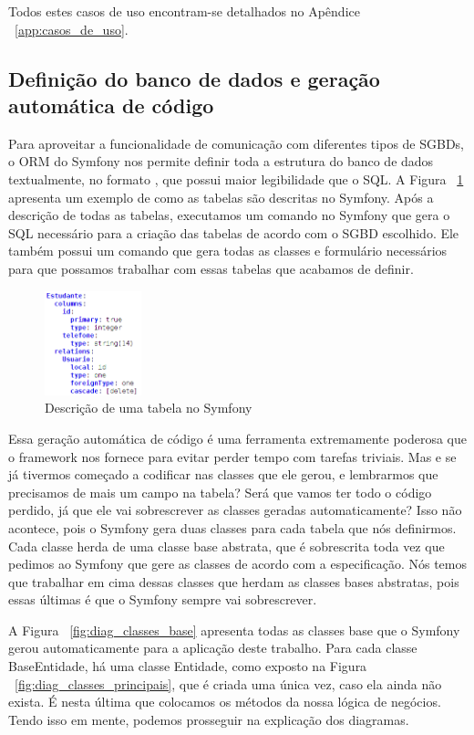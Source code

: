 Todos estes casos de uso encontram-se detalhados no Apêndice ~\ref{app:casos_de_uso}.

\subsection{Definição do banco de dados e geração automática de código}
Para aproveitar a funcionalidade de comunicação com diferentes tipos de SGBDs, o ORM
do Symfony nos permite definir toda a estrutura do banco de dados textualmente, no formato
, que possui maior legibilidade que o SQL.
A Figura ~\ref{fig:tabela_yaml} apresenta um exemplo de como as tabelas são descritas no Symfony.
Após a descrição de todas as tabelas, executamos um comando no Symfony que gera o SQL necessário
para a criação das tabelas de acordo com o SGBD escolhido. Ele também possui um comando
que gera todas as classes e formulário necessários para que possamos trabalhar com essas tabelas
que acabamos de definir.

\begin{figure}[htbp]
\centering
\includegraphics[width=0.25\textwidth]{fig/tabela_yaml.png}
\caption{Descrição de uma tabela no Symfony}
\label{fig:tabela_yaml}
\end{figure}

Essa geração automática de código é uma ferramenta extremamente poderosa que o framework nos
fornece para evitar perder tempo com tarefas triviais. Mas e se já tivermos começado a codificar
nas classes que ele gerou, e lembrarmos que precisamos de mais um campo na tabela? Será que
vamos ter todo o código perdido, já que ele vai sobrescrever as classes geradas automaticamente?
Isso não acontece, pois o Symfony gera duas classes para cada tabela que nós definirmos. Cada classe
herda de uma classe base abstrata, que é sobrescrita toda vez que pedimos ao Symfony que gere
as classes de acordo com a especificação. Nós temos que trabalhar em cima dessas classes que
herdam as classes bases abstratas, pois essas últimas é que o Symfony sempre vai sobrescrever.

A Figura ~\ref{fig:diag_classes_base} apresenta todas as classes base que o Symfony gerou automaticamente
para a aplicação deste trabalho.
Para cada classe BaseEntidade, há uma classe Entidade, como exposto na Figura ~\ref{fig:diag_classes_principais}, 
que é criada uma única vez, caso ela ainda não exista. É nesta última que colocamos os métodos da nossa 
lógica de negócios. Tendo isso em mente, podemos prosseguir na explicação dos diagramas.

